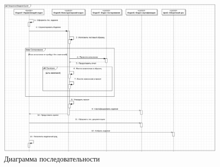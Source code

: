 \documentclass[a4paper,12pt]{report}
\begin{document}
\begin{figure}[h!]
	\centering
	\includegraphics[width=1\linewidth]{images/sequence}
	\caption{Диаграмма последовательности}
	\label{fig:sequence}
\end{figure}


\newpage
{}
\listoffigures
\newpage
{}
\listoftables
\end{document}
